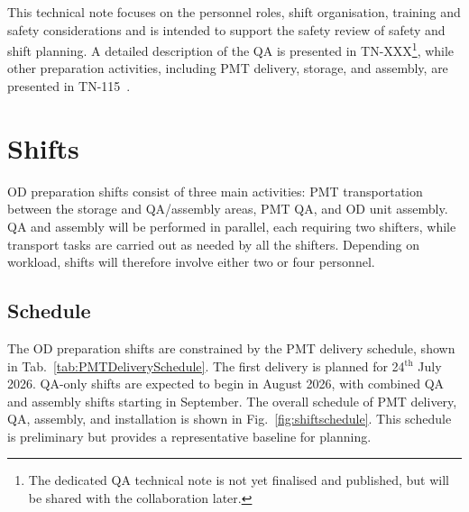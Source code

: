 \documentclass[12pt,a4paper]{article}
\begin{document}
This technical note focuses on the personnel roles, shift organisation, training and safety considerations and is intended to support the safety review of safety and shift planning. A detailed description of the QA is presented in TN-XXX\footnote{The dedicated QA technical note is not yet finalised and published, but will be shared with the collaboration later.}, while other preparation activities, including PMT delivery, storage, and assembly, are presented in TN-115~\cite{ODAssemblyTN}.

\section{Shifts} \label{sec:shifts}
OD preparation shifts consist of three main activities: PMT transportation between the storage and QA/assembly areas, PMT QA, and OD unit assembly. QA and assembly will be performed in parallel, each requiring two shifters, while transport tasks are carried out as needed by all the shifters. Depending on workload, shifts will therefore involve either two or four personnel.

\subsection{Schedule}
The OD preparation shifts are constrained by the PMT delivery schedule, shown in Tab.~\ref{tab:PMTDeliverySchedule}. The first delivery is planned for 24$^{\text{th}}$ July 2026. QA-only shifts are expected to begin in August 2026, with combined QA and assembly shifts starting in September. The overall schedule of PMT delivery, QA, assembly, and installation is shown in Fig.~\ref{fig:shiftschedule}. This schedule is preliminary but provides a representative baseline for planning.
\end{document}
